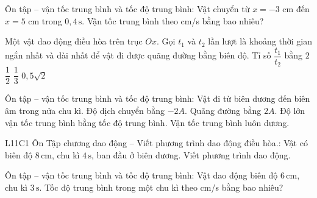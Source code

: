 \begin{ex}
Ôn tập – vận tốc trung bình và tốc độ trung bình: Vật chuyển từ $x=-3$ cm đến $x=5$ cm trong $0,4\,\text{s}$. Vận tốc trung bình theo cm/s bằng bao nhiêu?
\end{ex}

\begin{ex}
Một vật dao động điều hòa trên trục $Ox$. Gọi $t_1$ và $t_2$ lần lượt là khoảng thời gian ngắn nhất và dài nhất để vật đi được quãng đường bằng biên độ. Tỉ số $\dfrac{t_1}{t_2}$ bằng
\choice
{$2$}
{\True $\dfrac{1}{2}$}
{$\dfrac{1}{3}$}
{$0,5\sqrt{2}$}
\end{ex}

\begin{ex}
Ôn tập – vận tốc trung bình và tốc độ trung bình: Vật đi từ biên dương đến biên âm trong nửa chu kì.
\choiceTF
{\True Độ dịch chuyển bằng $-2A$.}
{\True Quãng đường bằng $2A$.}
{\True Độ lớn vận tốc trung bình bằng tốc độ trung bình.}
{Vận tốc trung bình luôn dương.}
\end{ex}

\begin{bt}
L11C1 Ôn Tập chương dao động – Viết phương trình dao động điều hòa.: Vật có biên độ $8\,\text{cm}$, chu kì $4\,\text{s}$, ban đầu ở biên dương. Viết phương trình dao động.
\end{bt}

\begin{ex}
Ôn tập – vận tốc trung bình và tốc độ trung bình: Vật dao động biên độ $6\,\text{cm}$, chu kì $3\,\text{s}$. Tốc độ trung bình trong một chu kì theo cm/s bằng bao nhiêu?
\end{ex}

